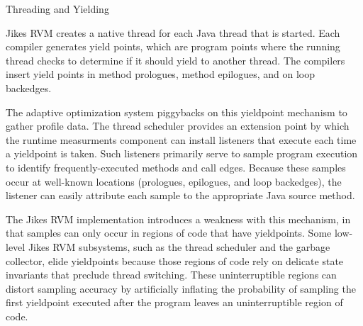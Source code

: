 \begin{section}{Threading and Yielding}
\label{sec:threadingandyielding}

Jikes RVM creates a native thread for each Java thread that is started. Each compiler generates yield points, which are program points where the running thread checks to determine if it should yield to another thread. The compilers insert yield points in method prologues, method epilogues, and on loop backedges.

The adaptive optimization system piggybacks on this yieldpoint mechanism to gather profile data. The thread scheduler provides an
extension point by which the runtime measurments component can install listeners that execute each time a yieldpoint is taken. Such listeners primarily serve to sample program execution to identify frequently-executed methods and call edges. Because these samples occur at well-known locations (prologues, epilogues, and loop backedges), the listener can easily attribute each sample to the appropriate Java source method.

The Jikes RVM implementation introduces a weakness with this mechanism, in that samples can only occur in regions of code that have yieldpoints.  Some low-level Jikes RVM subsystems, such as the thread scheduler and the garbage collector, elide yieldpoints because
those regions of code rely on delicate state invariants that preclude thread switching. These uninterruptible regions can distort sampling accuracy by artificially inflating the probability of sampling  the first yieldpoint executed after the program leaves an uninterruptible region of code.

\end{section}
